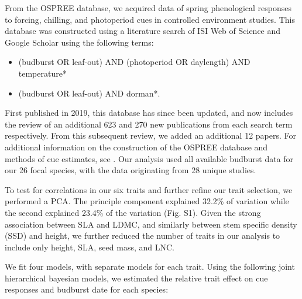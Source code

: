 \documentclass{article}\usepackage[]{graphicx}\usepackage[]{color}
\begin{document}
From the OSPREE database, we acquired data of spring phenological responses to forcing, chilling, and photoperiod cues in controlled environment studies. This database was constructed using a literature search of ISI Web of Science and Google Scholar using the following terms:
\begin{itemize}
\item (budburst OR leaf-out) AND (photoperiod OR daylength) AND temperature* 
\item (budburst OR leaf-out) AND dorman*.
\end{itemize}
First published in 2019, this database has since been updated, and now includes the review of an additional 623 and 270 new publications from each search term respectively. From this subsequent review, we added an additional 12 papers. For additional information on the construction of the OSPREE database and methods of cue estimates, see \citep{OSPREE}. Our analysis used all available budburst data for our 26 focal species, with the data originating from 28 unique studies. %

To test for correlations in our six traits and further refine our trait selection, we performed a PCA. The principle component explained 32.2\% of variation while the second explained 23.4\% of the variation (Fig. S1). Given the strong association between SLA and LDMC, and similarly between stem specific density (SSD) and height, we further reduced the number of traits in our analysis to include only height, SLA, seed mass, and LNC. 

We fit four models, with separate models for each trait.  Using the following joint hierarchical bayesian models, we estimated the relative trait effect on cue responses and budburst date for each species: 
\end{document}
